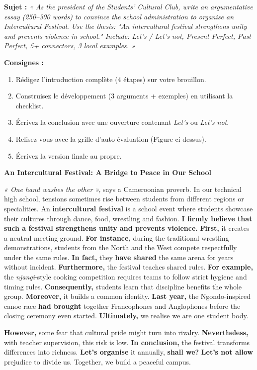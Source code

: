 \documentclass[11pt]{article}
\begin{document}
\begin{exercice}
\textbf{Sujet :} \emph{« As the president of the Students' Cultural Club, write an argumentative essay (250--300 words) to convince the school administration to organise an Intercultural Festival. Use the thesis: "An intercultural festival strengthens unity and prevents violence in school." Include: Let's / Let's not, Present Perfect, Past Perfect, 5+ connectors, 3 local examples. »}

\textbf{Consignes :}
\begin{enumerate}
    \item Rédigez l'introduction complète (4 étapes) sur votre brouillon.
    \item Construisez le développement (3 arguments + exemples) en utilisant la checklist.
    \item Écrivez la conclusion avec une ouverture contenant \emph{Let's} ou \emph{Let's not}.
    \item Relisez-vous avec la grille d'auto-évaluation (Figure ci-dessus).
    \item Écrivez la version finale au propre.
\end{enumerate}
\end{exercice}

\begin{corrige}
\textbf{An Intercultural Festival: A Bridge to Peace in Our School}

\emph{« One hand washes the other »,} says a Cameroonian proverb. In our technical high school, tensions sometimes rise between students from different regions or specialities. An \textbf{intercultural festival} is a school event where students showcase their cultures through dance, food, wrestling and fashion. \textbf{I firmly believe that such a festival strengthens unity and prevents violence.} \textbf{First,} it creates a neutral meeting ground. \textbf{For instance,} during the traditional wrestling demonstrations, students from the North and the West compete respectfully under the same rules. \textbf{In fact,} they \textbf{have shared} the same arena for years without incident. \textbf{Furthermore,} the festival teaches shared rules. \textbf{For example,} the \emph{njangi}-style cooking competition requires teams to follow strict hygiene and timing rules. \textbf{Consequently,} students learn that discipline benefits the whole group. \textbf{Moreover,} it builds a common identity. \textbf{Last year,} the Ngondo-inspired canoe race \textbf{had brought} together Francophones and Anglophones before the closing ceremony even started. \textbf{Ultimately,} we realise we are one student body.

\textbf{However,} some fear that cultural pride might turn into rivalry. \textbf{Nevertheless,} with teacher supervision, this risk is low. \textbf{In conclusion,} the festival transforms differences into richness. \textbf{Let's organise} it annually, \textbf{shall we?} \textbf{Let's not allow} prejudice to divide us. Together, we build a peaceful campus.
\end{corrige}
\end{document}
